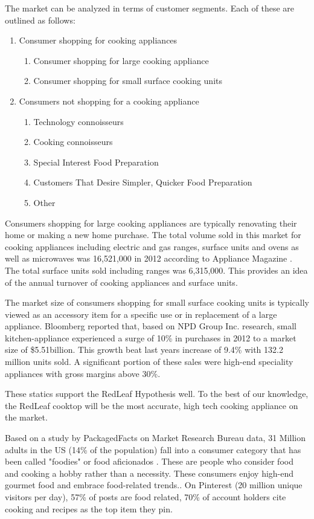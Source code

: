 \documentclass[11pt]{article}
\theoremstyle{definition}
\begin{document}
The market can be analyzed in terms of customer segments. Each of these are outlined as follows:

\begin{enumerate}
\item Consumer shopping for cooking appliances
\begin{enumerate}
	\item Consumer shopping for large cooking appliance
	\item Consumer shopping for small surface cooking units
\end{enumerate}
\item Consumers not shopping for a cooking appliance
	\begin{enumerate}
		\item Technology connoisseurs
		\item Cooking connoisseurs
		\item Special Interest Food Preparation
		\item Customers That Desire Simpler, Quicker Food Preparation
		\item Other
	\end{enumerate}
\end{enumerate}


Consumers shopping for large cooking appliances are typically renovating their home or making a new home purchase. The total volume sold in this market for cooking appliances including electric and gas ranges, surface units and ovens as well as microwaves was 16,521,000 in 2012 according to Appliance Magazine \cite{appmag}. The total surface units sold including ranges was 6,315,000. This provides an idea of the annual turnover of cooking appliances and surface units.

The market size of consumers shopping for small surface cooking units is typically viewed as an accessory item for a specific use or in replacement of a large appliance. 
Bloomberg reported that, based on NPD Group Inc. research, small kitchen-appliance experienced a surge of 10\% in purchases in 2012 to a market size of \$5.51billion. This growth beat last years increase of 9.4\% with 132.2 million units sold. A significant portion of these sales were high-end speciality appliances with gross margins above 30\%.

These statics support the RedLeaf Hypothesis well. To the best of our knowledge, the RedLeaf cooktop will be the most accurate, high tech cooking appliance on the market. 


Based on a study by PackagedFacts on Market Research Bureau data, 31 Million adults in the US (14\% of the population) fall into a consumer category that has been called "foodies" or food aficionados \cite{foodie_facts}. These are people who consider food and cooking a hobby rather than a necessity. These consumers enjoy high-end gourmet food and embrace food-related trends..  On Pinterest (20 million unique visitors per day), 57\% of posts  are food related, 70\% of account holders cite cooking and recipes as the top item they pin. 
\end{document}
